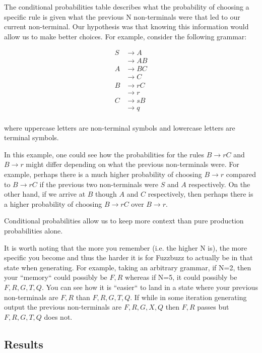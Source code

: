 The conditional probabilities table describes what the probability of choosing a
specific rule is given what the previous N non-terminals were that led to our
current non-terminal. Our hypothesis was that knowing this information would
allow us to make better choices. For example, consider the following grammar:

\begin{align*}
S &\rightarrow A \\
&\rightarrow A B \\
A &\rightarrow B C \\
&\rightarrow C \\
B &\rightarrow r C \\
&\rightarrow r \\
C &\rightarrow s B \\
&\rightarrow q \\
\end{align*}

\noindent
where uppercase letters are non-terminal symbols and lowercase letters are
terminal symbols.


In this example, one could see how the probabilities for the rules $B
\rightarrow rC$ and $B \rightarrow r$ might differ depending on what the
previous non-terminals were. For example, perhaps there is a much higher
probability of choosing $B \rightarrow r$ compared to $B \rightarrow rC$ if the
previous two non-terminals were $S$ and $A$ respectively. On the other hand, if
we arrive at $B$ though $A$ and $C$ respectively, then perhaps there is a
higher probability of choosing $B \rightarrow rC$ over $B \rightarrow r$.

Conditional probabilities allow us to keep more context than pure production
probabilities alone.

It is worth noting that the more you remember (i.e. the higher N is), the more
specific you become and thus the harder it is for Fuzzbuzz to actually be in
that state when generating. For example, taking an arbitrary grammar, if N=2,
then your ``memory`` could possibly be $F, R$ whereas if N=5, it could possibly
be $F, R, G, T, Q$. You can see how it is ``easier`` to land in a state where
your previous non-terminals are $F, R$ than $F, R, G, T, Q$. If while in some
iteration generating output the previous non-terminals are $F, R, G, X, Q$ then
$F, R$ passes but $F, R, G, T, Q$ does not.

\subsection{Results}


